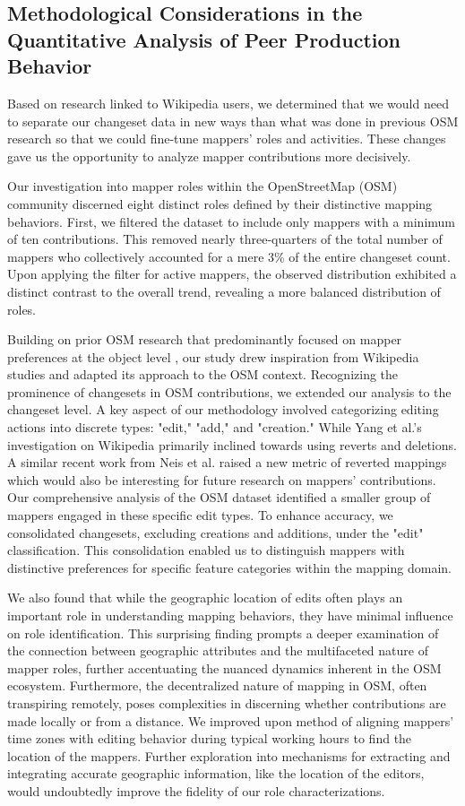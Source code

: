 \documentclass[manuscript,screen,review]{acmart}
\begin{document}
\subsection{Methodological Considerations in the Quantitative Analysis of Peer Production Behavior}
Based on research linked to Wikipedia users, we determined that we would need to separate our changeset data in new ways than what was done in previous OSM research so that we could fine-tune mappers’ roles and activities. These changes gave us the opportunity to analyze mapper contributions more decisively. 

Our investigation into mapper roles within the OpenStreetMap (OSM) community discerned eight distinct roles defined by their distinctive mapping behaviors. First, we filtered the dataset to include only mappers with a minimum of ten contributions. This removed nearly three-quarters of the total number of mappers who collectively accounted for a mere 3\% of the entire changeset count. Upon applying the filter for active mappers, the observed distribution exhibited a distinct contrast to the overall trend, revealing a more balanced distribution of roles.

Building on prior OSM research that predominantly focused on mapper preferences at the object level \cite{Neis12}, our study drew inspiration from Wikipedia studies \cite{Yang21} and adapted its approach to the OSM context. Recognizing the prominence of changesets in OSM contributions, we extended our analysis to the changeset level. A key aspect of our methodology involved categorizing editing actions into discrete types: "edit," "add," and "creation." While Yang et al.'s investigation \cite{Yang21} on Wikipedia primarily inclined towards using reverts and deletions. A similar recent work from Neis et al.\cite{Neis23} raised a new metric of reverted mappings which would also be interesting for future research on mappers' contributions. Our comprehensive analysis of the OSM dataset identified a smaller group of mappers engaged in these specific edit types. To enhance accuracy, we consolidated changesets, excluding creations and additions, under the "edit" classification. This consolidation enabled us to distinguish mappers with distinctive preferences for specific feature categories within the mapping domain.

We also found that while the geographic location of edits often plays an important role in understanding mapping behaviors, they have minimal influence on role identification. This surprising finding prompts a deeper examination of the connection between geographic attributes and the multifaceted nature of mapper roles, further accentuating the nuanced dynamics inherent in the OSM ecosystem. Furthermore, the decentralized nature of mapping in OSM, often transpiring remotely, poses complexities in discerning whether contributions are made locally or from a distance. We improved upon \cite{Veselovsky22} method of aligning mappers' time zones with editing behavior during typical working hours to find the location of the mappers. Further exploration into mechanisms for extracting and integrating accurate geographic information, like the location of the editors, would undoubtedly improve the fidelity of our role characterizations.
\end{document}

